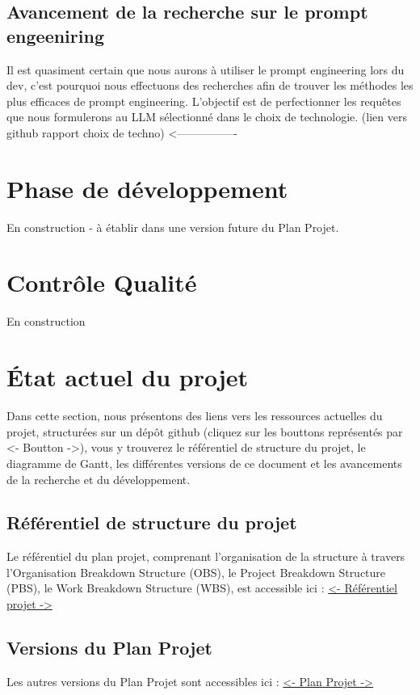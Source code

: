 \documentclass[11pt]{rapport_class}
\begin{document}
\section{Avancement de la recherche sur le prompt engeeniring}
\qquad Il est quasiment certain que nous aurons à utiliser le prompt engineering lors du dev, c'est pourquoi nous effectuons des recherches afin de trouver les méthodes les plus efficaces de prompt engineering. L'objectif est de perfectionner les requêtes que nous formulerons au LLM sélectionné dans le choix de technologie.
 (lien vers github rapport choix de techno) <----------------



\chapter{Phase de développement}
\centerline{En construction - à établir dans une version future du Plan Projet.}

\chapter{Contrôle Qualité}
\centerline{En construction}


\chapter{ État actuel du projet}
\qquad Dans cette section, nous présentons des liens vers les ressources actuelles du projet, structurées sur un dépôt github (cliquez sur les bouttons représentés par <- Boutton ->), vous y trouverez le référentiel de structure du projet, le diagramme de Gantt, les différentes versions de ce document et les avancements de la recherche et du développement.

\section{Référentiel de structure du projet}
\qquad Le référentiel du plan projet, comprenant l'organisation de la structure à travers l'Organisation Breakdown Structure (OBS), le Project Breakdown Structure (PBS), le Work Breakdown Structure (WBS), est accessible ici :
\href{https://github.com/fghjklm/Projet_M1_CheckThat-/tree/main/referentiel_projet}{<- Référentiel projet ->}

\section{Versions du Plan Projet}
\qquad Les autres versions du Plan Projet sont accessibles ici :
\href{https://github.com/fghjklm/Projet_M1_CheckThat-/tree/main/plan_projet}{<- Plan Projet ->}
\end{document}
